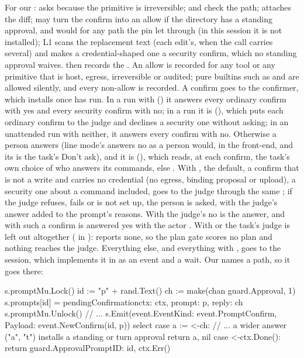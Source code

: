 For our :  asks because the primitive is
irreversible;  and  check the path;
 attaches the diff;  may turn the
confirm into an allow if the directory has a standing approval, and
 would for any path the pin let through (in this
session it is not installed); L1 scans the replacement text (each
edit's, when the call carries several) and makes a credential-shaped one a
security confirm, which no standing approval waives.
 then records the . An allow is recorded
for any tool or any primitive that is host, egress, irreversible or
audited; pure builtins such as  and \code{+} are allowed
silently, and every non-allow is recorded. A confirm goes to the
confirmer, which  installs once  has run.
In a run with  () it answers
every ordinary confirm with yes and every security confirm with no; in a  run it is 
(), which puts each ordinary confirm to the
judge and declines a security one without asking; in an unattended run
with neither, it answers every confirm with no. Otherwise a person answers
(line mode's  answers no as a person would, in the
front-end, and its  is the task's Don't ask),
and it is  (),
which reads, at each confirm, the task's own choice of who answers its
commands, else . With , the
default, a confirm that is not a write and carries no credential (no
egress, binding proposal or upload), a security one about a command
included, goes to the judge through the same ; if the
judge refuses, fails or is not set up, the person is asked, with the
judge's answer added to the prompt's reasons. With 
the judge's no is the answer, and with  such a confirm is
answered yes with the actor . With  or
 the task's judge is left out altogether
( in ):
 reports none, so the plan gate scores no plan and
nothing reaches the judge. Everything else, and
everything with , goes
to the session, which implements it in  as
an event and a wait. Our  names a path, so it goes there:

\begin{go}
s.promptMu.Lock()
id := "p" + rand.Text()
ch := make(chan guard.Approval, 1)
s.prompts[id] = pendingConfirmation{ctx: ctx, prompt: p, reply: ch}
s.promptMu.Unlock()
// ...
s.Emit(event.Event{Kind: event.PromptConfirm, Payload: event.NewConfirm(id, p)})
select {
case a := <-ch:
    // ... a wider answer ("a", "t") installs a standing or turn approval
    return a, nil
case <-ctx.Done():
    return guard.Approval{PromptID: id}, ctx.Err()
}
\end{go}

